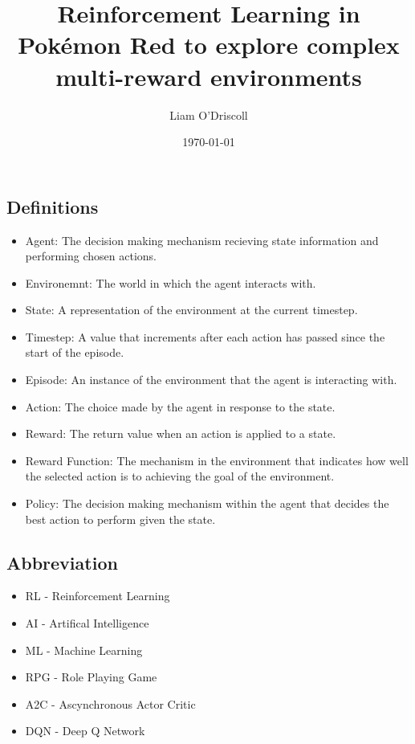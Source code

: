 \documentclass{surrey_disso_style}
\title{Reinforcement Learning in Pokémon Red to explore complex multi-reward environments}
\author{Liam O'Driscoll}
\date{\today}
\begin{document}
\maketitle



\subsection{Definitions}
\begin{itemize}
   \item [\ding{171}] Agent: The decision making mechanism recieving state information and performing chosen actions.
   \item [\ding{171}] Environemnt: The world in which the agent interacts with. 
   \item [\ding{171}] State: A representation of the environment at the current timestep.
   \item [\ding{171}] Timestep: A value that increments after each action has passed since the start of the episode.
   \item [\ding{171}] Episode: An instance of the environment that the agent is interacting with.
   \item [\ding{171}] Action: The choice made by the agent in response to the state.
   \item [\ding{171}] Reward: The return value when an action is applied to a state.
   \item [\ding{171}] Reward Function: The mechanism in the environment that indicates how well the selected action is to achieving the goal of the environment.
   \item [\ding{171}] Policy: The decision making mechanism within the agent that decides the best action to perform given the state.
\end{itemize}

\subsection{Abbreviation}
\begin{itemize}
   \item [\ding{171}] RL - Reinforcement Learning 
   \item [\ding{171}] AI - Artifical Intelligence
   \item [\ding{171}] ML - Machine Learning 
   \item [\ding{171}] RPG - Role Playing Game
   \item [\ding{171}] A2C - Ascynchronous Actor Critic
   \item [\ding{171}] DQN - Deep Q Network
\end{itemize}
\end{document}
